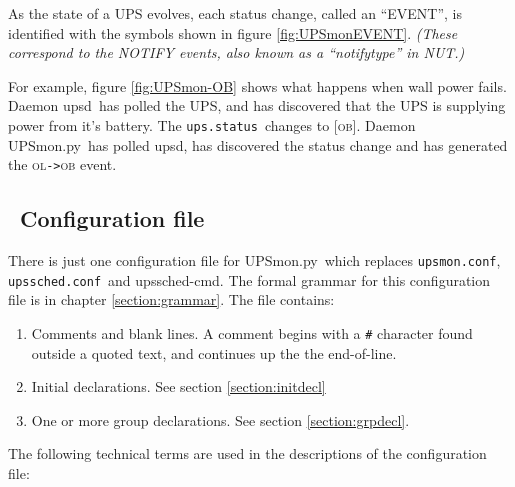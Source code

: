 \documentclass[12pt]{article}
\newlength{\headersep}\setlength{\headersep}{3mm}
\newcommand{\Hsep}{\hspace{\headersep}}
\newcommand{\upsd}{\mbox{\textcolor{UPSDCOLOUR}{upsd}}}
\newcommand{\upsschedcmd}{\mbox{\textcolor{CMDCOLOUR}{upssched-cmd}}}
\newcommand{\UPSmon}{\mbox{\textcolor{UPSMONCOLOUR}{UPSmon.py}}}
\newcommand{\OB}{\textcolor{UPSDCOLOUR}{\textsc{ob}}}
\newcommand{\OL}{\textcolor{UPSDCOLOUR}{\textsc{ol}}}
\newcommand{\status}[1]{\textcolor{UPSDCOLOUR}{[{#1}]}}
\newcommand{\EVENT}[2]{\textcolor{MONCOLOUR}{#1}{\allowbreak}\texttt{\textcolor{MONCOLOUR}{->}}{\allowbreak}\textcolor{MONCOLOUR}{#2}}
\newcommand{\upsmonconf}{\textcolor{MONCOLOUR}{\texttt{upsmon.conf}}}
\newcommand{\upsschedconf}{\textcolor{SCHEDCOLOUR}{\texttt{upssched.conf}}}
\newcommand{\upsstatus}{\textcolor{UPSDCOLOUR}{\texttt{ups{\allowbreak}.status}}}
\newcommand{\ol}{\begin{enumerate}%
   \setlength{\itemsep}{0em}}
\newcommand{\eol}{\end{enumerate}}
\newcommand{\li}{\item}                 %
\begin{document}
As the state of a UPS evolves, each status change, called an ``EVENT'', is
identified with the symbols shown in figure \ref{fig:UPSmonEVENT}.
\textit{(These correspond to the NOTIFY events, also known as a ``notifytype''
  in NUT.)}

For example, figure \ref{fig:UPSmon-OB} shows what happens when wall power
fails.  Daemon \upsd\ has polled the UPS, and has discovered that the UPS is
supplying power from it's battery.  The \upsstatus\ changes to \status{\OB}.
Daemon \UPSmon\ has polled \upsd, has discovered the status change and has
generated the \EVENT{\OL}{\OB} event.


\subsection{\Hsep\ Configuration file}\label{section:UPSmonconffile}

There is just one configuration file for \UPSmon\ which replaces \upsmonconf,
\upsschedconf\ and \upsschedcmd.  The formal grammar for this configuration
file is in chapter \ref{section:grammar}.  The file contains:

\ol

\li Comments and blank lines.  A comment begins with a \texttt{\#} character
found outside a quoted text, and continues up the the end-of-line.

\li Initial declarations.  See section \ref{section:initdecl}

\li One or more group declarations.  See section \ref{section:grpdecl}.

\eol

The following technical terms are used in the descriptions of the
configuration file:
\end{document}
